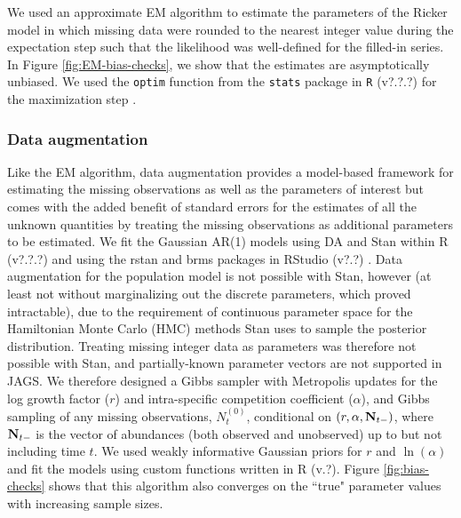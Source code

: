\documentclass{article}
\begin{document}
We used an approximate EM algorithm to estimate the parameters of the Ricker model in which missing data were rounded to the nearest integer value during the expectation step such that the likelihood was well-defined for the filled-in series. In Figure \ref{fig:EM-bias-checks}, we show that the estimates are asymptotically unbiased. We used the \texttt{optim} function from the \texttt{stats} package in \texttt{R} (v?.?.?) for the maximization step \citep{r_2021}.

\subsubsection*{Data augmentation}

Like the EM algorithm, data augmentation provides a model-based framework for estimating the missing observations as well as the parameters of interest but comes with the added benefit of standard errors for the estimates of all the unknown quantities by treating the missing observations as additional parameters to be estimated. We fit the Gaussian AR(1) models using DA and Stan \citep{carpenter_stan_2017} within R (v?.?.?) \citep{} and using the rstan \citep{} and brms \citep{} packages in RStudio (v?.?) \citep{}. Data augmentation for the population model is not possible with Stan, however (at least not without marginalizing out the discrete parameters, which proved intractable), due to the requirement of continuous parameter space for the Hamiltonian Monte Carlo (HMC) methods Stan uses to sample the posterior distribution. Treating missing integer data as parameters was therefore not possible with Stan, and partially-known parameter vectors are not supported in JAGS. We therefore designed a Gibbs sampler with Metropolis updates for the log growth factor ($r$) and intra-specific competition coefficient ($\alpha$), and Gibbs sampling of any missing observations, $N_{t}^{(0)}$, conditional on $(r, \alpha, {\bf N}_{t-})$, where ${\bf N}_{t-}$ is the vector of abundances (both observed and unobserved) up to but not including time $t$. We used weakly informative Gaussian priors for $r$ and $\ln(\alpha)$ and fit the models using custom functions written in R (v.?). Figure \ref{fig:bias-checks} shows that this algorithm also converges on the ``true" parameter values with increasing sample sizes. 
\end{document}
